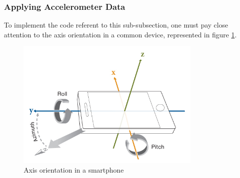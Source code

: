 \subsubsection{Applying Accelerometer Data}
\label{sec:accelerometer-using_data}
%
To implement the code referent to this sub-subsection, one must pay close attention to the axis orientation in a common device, represented in figure \ref{fig:axis-smartphone}.
%
\begin{figure}[!ht]
\centering
\includegraphics[width=0.8\textwidth]{img/smartphone_axis.png}
\caption{\label{fig:axis-smartphone}Axis orientation in a smartphone}
\end{figure}
%